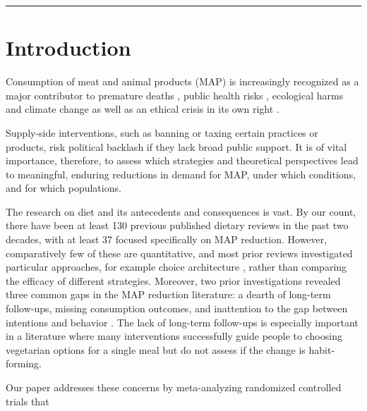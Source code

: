 \documentclass[sn-nature,referee,pdflatex]{sn-jnl}
\begin{document}
\maketitle

\begin{center}\rule{0.5\linewidth}{0.5pt}\end{center}

\section{Introduction}\label{sec1}

Consumption of meat and animal products (MAP) is increasingly recognized
as a major contributor to premature deaths
\citep{willett2019, landry2023}, public health risks
\citep{slingenbergh2004, graham2008}, ecological harms
\citep{greger2010} and climate change
\citep{scarborough2023, koneswaran2008} as well as an ethical crisis in
its own right \citep{kuruc2023, singer2023}.

Supply-side interventions, such as banning or taxing certain practices
or products, risk political backlash if they lack broad public support.
It is of vital importance, therefore, to assess which strategies and
theoretical perspectives lead to meaningful, enduring reductions in
demand for MAP, under which conditions, and for which populations.

The research on diet and its antecedents and consequences is vast. By
our count, there have been at least 130 previous published dietary
reviews in the past two decades, with at least 37 focused specifically
on MAP reduction. However, comparatively few of these are quantitative,
and most prior reviews investigated particular approaches, for example
choice architecture \citep{bianchi2018restructuring}, rather than
comparing the efficacy of different strategies. Moreover, two prior
investigations revealed three common gaps in the MAP reduction
literature: a dearth of long-term follow-ups, missing consumption
outcomes, and inattention to the gap between intentions and behavior
\citep{mathur2021meta, mathur2021effectiveness}. The lack of long-term
follow-ups is especially important in a literature where many
interventions successfully guide people to choosing vegetarian options
for a single meal \citep{hansen2019} but do not assess if the change is
habit-forming.

Our paper addresses these concerns by meta-analyzing randomized
controlled trials that
\end{document}
